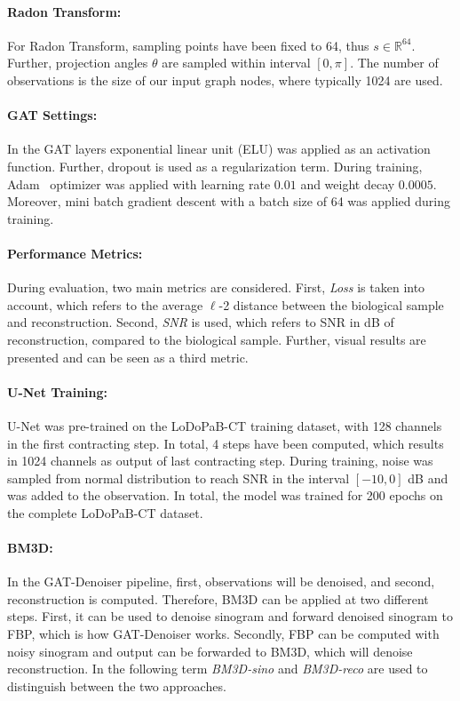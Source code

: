 \paragraph{Radon Transform:}
For Radon Transform, sampling points have been fixed to 64, thus $s \in \mathbb{R}^{64}$.
Further, projection angles $\theta$ are sampled within interval $[0, \pi]$.
The number of observations is the size of our input graph nodes, where typically 1024 are used.

\paragraph{GAT Settings:}
In the GAT layers exponential linear unit (ELU) was applied as an activation function.
Further, dropout is used as a regularization term.
During training, Adam~\cite{adam} optimizer was applied with learning rate $0.01$ and weight decay $0.0005$.
Moreover, mini batch gradient descent with a batch size of 64 was applied during training.

\paragraph{Performance Metrics:}
During evaluation, two main metrics are considered.
First, \textit{Loss} is taken into account, which refers to the average $\ell$-2 distance between the biological sample and reconstruction.
Second, \textit{SNR} is used, which refers to SNR in dB of reconstruction, compared to the biological sample.
Further, visual results are presented and can be seen as a third metric.


\paragraph{U-Net Training:}
U-Net was pre-trained on the LoDoPaB-CT training dataset, with 128 channels in the first contracting step. 
In total, 4 steps have been computed, which results in 1024 channels as output of last contracting step.
During training, noise was sampled from normal distribution to reach SNR in the interval $[-10, 0]$ dB 
and was added to the observation. In total, the model was trained for 200 epochs on the complete LoDoPaB-CT dataset.

\paragraph{BM3D:}
In the GAT-Denoiser pipeline, first, observations will be denoised, and second, reconstruction is computed.
Therefore, BM3D can be applied at two different steps. First, it can be used to denoise sinogram
and forward denoised sinogram to FBP, which is how GAT-Denoiser works. Secondly, FBP can be
computed with noisy sinogram and output can be forwarded to BM3D, which will denoise reconstruction.
In the following term \textit{BM3D-sino} and \textit{BM3D-reco} are used to distinguish between the two approaches.

